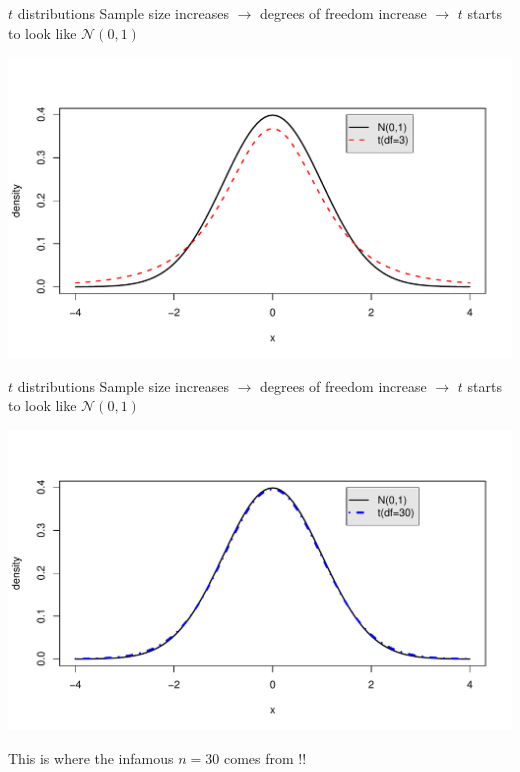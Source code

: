 \documentclass{beamer}\usepackage[]{graphicx}\usepackage[]{color}
\newenvironment{knitrout}{}{} %
\begin{document}
\begin{frame}[fragile]{$t$ distributions}
Sample size increases $\rightarrow$ degrees of freedom increase $\rightarrow$ $t$ starts to look like $\mathcal{N}(0,1)$
\begin{knitrout}\scriptsize
{}\color{fgcolor}

{\centering \includegraphics[width=1\linewidth]{figure/unnamed-chunk-8-1} 

}



\end{knitrout}
\end{frame}

\begin{frame}[fragile]{$t$ distributions}
Sample size increases $\rightarrow$ degrees of freedom increase $\rightarrow$ $t$ starts to look like $\mathcal{N}(0,1)$
\begin{knitrout}\scriptsize
{}\color{fgcolor}

{\centering \includegraphics[width=1\linewidth]{figure/unnamed-chunk-9-1} 

}



\end{knitrout}

\Large This is where the infamous $n=30$ comes from !!
\end{frame}
\end{document}
